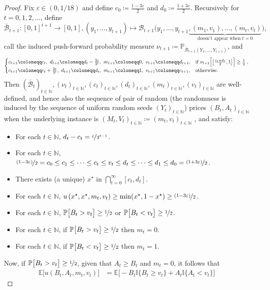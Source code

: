 \documentclass[final,12pt]{colt2025}
\newcommand{\cB}{\mathcal{B}}
\newcommand{\E}{\mathbb{E}}
\newcommand{\N}{\mathbb{N}}
\newcommand{\Pb}{\mathbb{P}}
\newcommand{\e}{\varepsilon}
\newcommand{\lrb}[1]{\left(#1\right)}
\newcommand{\brb}[1]{\bigl(#1\bigr)}
\newcommand{\bsb}[1]{\bigl[#1\bigr]}
\newcommand{\Bsb}[1]{\Bigl[#1\Bigr]}
\newcommand{\one}[1]{\mathbb{I}\{#1\}}
\newcommand{\util}{u}
\newcommand{\itemm}{\item[$\bullet$]}
\newcommand{\nP}{M}
\newcommand{\np}{m}
\newcommand{\nZ}{V}
\newcommand{\nz}{v}
\newcommand{\nB}{B}
\newcommand{\ncB}{\cB}
\newcommand{\nS}{A}
\newcommand{\nc}{c}
\begin{document}
{\begin{proof}
Fix $\e \in (0, 1/18)$ and define $c_0 \coloneqq \frac{1-3\e}{2}$ and $d_0 \coloneqq \frac{1+3 \e}{2}$.
Recursively for $t = 0,1,2,\dots$, define 
\[
\bar{\ncB}_{t+1} : [0,1]^{t+1} \to [0,1], (y_1,\dots,y_{t+1}) \mapsto \ncB_{t+1} \brb{ y_1, \dots, y_{t+1} \underbrace{, (\np_1,\nz_1), \dots, (\np_t,\nz_t) }_{\text{doesn't appear when } t = 0} }, 
\]
call the induced push-forward probability measure $\nu_{t+1} \coloneqq \Pb_{\bar{\ncB}_{t+1}(Y_1,\dots,Y_{t+1})}$, and
\[
    \begin{cases}
        c_{t+1}\coloneqq c_{t}, \ d_{t+1}\coloneqq d_{t}-\frac{2\e}{3^{t}}, \ \np_{t+1}\coloneqq 0, \ \nz_{t+1}\coloneqq d_{t+1},
    &
        \text{if } \nu_{t+1}\Bsb{ \bsb{\frac{\nc_t+d_t}{2},1} }\ge\frac{1}{2} \;,
    \\
        c_{t+1}\coloneqq c_{t}+\frac{2\e}{3^{t}}, \ d_{t+1}\coloneqq d_{t}, \ \np_{t+1} \coloneqq 1, \ \nz_{t+1}\coloneqq c_{t+1},
    &
        \text{otherwise}.
    \end{cases}
\]
Then $(\bar{\ncB}_t)_{t \in \N}, (\nu_t)_{t \in \N}, (\nc_t)_{t \in \N}, (d_t)_{t \in \N}, (\np_t)_{t \in \N}, (\nz_t)_{t \in \N}$ are well-defined, and hence also the sequence of pair of random (the randomness is induced by the sequence of uniform random seeds $(Y_t)_{t \in \N}$) prices $(\nB_t,\nS_t)_{t\in\N}$ when the underlying instance is $(\nP_t, \nZ_t)_{t \in \N} \coloneqq (\np_t,\nz_t)_{t\in\N}$ , and satisfy:
\begin{itemize}
    \itemm For each $t \in \N$, $d_t-\nc_t = \nicefrac{\varepsilon}{3^{t-1}}$.
    \itemm For each $t \in \N$, $\nicefrac{(1-3\e)}{2} = c_0 \le \nc_1 \le \dots \le \nc_t \le \nz_t \le d_t \le \dots \le  d_1 \le d_0 = \nicefrac{(1+3\e)}{2}$.
    \itemm There exists (a unique) $x^\star$ in $\bigcap_{t=0}^{\infty}[\nc_t,d_t]$.
    \itemm For each $t \in \N$, $\util\lrb{x^\star,x^\star, \np_t,\nz_t} \ge \min (x^\star, 1-x^\star) \ge \nicefrac{(1-3\e)}{2}$.
    \itemm For each $t \in \N$, $\Pb\bsb{ \nB_t > \nz_t }\ge\nicefrac{1}{2}$ or $\Pb\bsb{ \nB_t < \nz_t }\ge\nicefrac{1}{2}$.
    \itemm For each $t\in \N$, if $\Pb\bsb{ \nB_t > \nz_t }\ge\nicefrac{1}{2}$ then $\np_t = 0$.
    \itemm For each $t\in \N$, if $\Pb\bsb{ \nB_t < \nz_t }\ge\nicefrac{1}{2}$ then $\np_t = 1$.
\end{itemize}
Now, if $\Pb\bsb{ \nB_t > \nz_t }\ge\nicefrac{1}{2}$, given that $\nS_t \ge \nB_t$ and $\np_t = 0$, it follows that
\begin{align*}
    \E\bsb{\util (\nB_t,\nS_t,\np_t,\nz_t) }
&=
    \E\bsb{ - \nB_t \one{\nB_t \ge \nz_t } + \nS_t \one{\nS_t < \nz_t} }

\end{align*}
\end{proof}}
\end{document}
